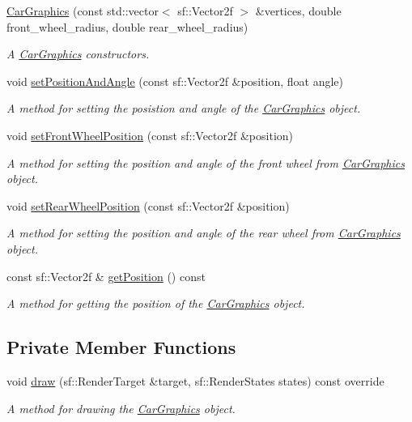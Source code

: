 \begin{DoxyCompactItemize}
\item 
\hyperlink{classCarGraphics_a37c8d0d08003f0a84495a3aedfe471db}{Car\+Graphics} (const std\+::vector$<$ sf\+::\+Vector2f $>$ \&vertices, double front\+\_\+wheel\+\_\+radius, double rear\+\_\+wheel\+\_\+radius)
\begin{DoxyCompactList}\small\item\em A \hyperlink{classCarGraphics}{Car\+Graphics} constructors. \end{DoxyCompactList}\item 
void \hyperlink{classCarGraphics_a66e55f3ba283beb484eb8285c40bda14}{set\+Position\+And\+Angle} (const sf\+::\+Vector2f \&position, float angle)
\begin{DoxyCompactList}\small\item\em A method for setting the posistion and angle of the \hyperlink{classCarGraphics}{Car\+Graphics} object. \end{DoxyCompactList}\item 
void \hyperlink{classCarGraphics_a02169a6fec9b7d4c076b5597a11eac08}{set\+Front\+Wheel\+Position} (const sf\+::\+Vector2f \&position)
\begin{DoxyCompactList}\small\item\em A method for setting the position and angle of the front wheel from \hyperlink{classCarGraphics}{Car\+Graphics} object. \end{DoxyCompactList}\item 
void \hyperlink{classCarGraphics_a30a28ce4d33808d22f6ca460c5b8013d}{set\+Rear\+Wheel\+Position} (const sf\+::\+Vector2f \&position)
\begin{DoxyCompactList}\small\item\em A method for setting the position and angle of the rear wheel from \hyperlink{classCarGraphics}{Car\+Graphics} object. \end{DoxyCompactList}\item 
const sf\+::\+Vector2f \& \hyperlink{classCarGraphics_a80e3b77608619843db5cbae4faee825b}{get\+Position} () const
\begin{DoxyCompactList}\small\item\em A method for getting the position of the \hyperlink{classCarGraphics}{Car\+Graphics} object. \end{DoxyCompactList}\end{DoxyCompactItemize}
\subsection*{Private Member Functions}
\begin{DoxyCompactItemize}
\item 
void \hyperlink{classCarGraphics_a7a9cf695c9bae5a533c21c6f5d78e635}{draw} (sf\+::\+Render\+Target \&target, sf\+::\+Render\+States states) const override
\begin{DoxyCompactList}\small\item\em A method for drawing the \hyperlink{classCarGraphics}{Car\+Graphics} object. \end{DoxyCompactList}\end{DoxyCompactItemize}
